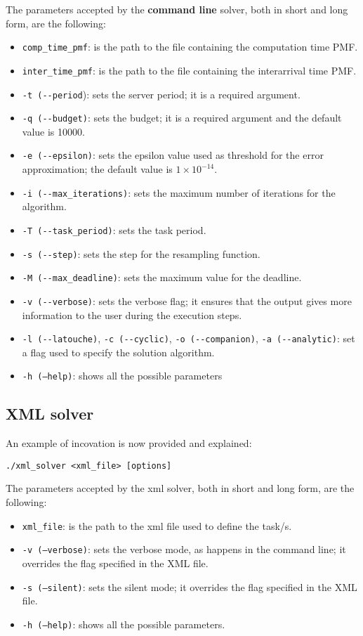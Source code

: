 The parameters accepted by the \textbf{command line} solver, both in short and long form, are the following:
\begin{itemize}
  \item \texttt{comp\_time\_pmf}: is the path to the file containing the computation time PMF.
  \item \texttt{inter\_time\_pmf}: is the path to the file containing the interarrival time PMF.
  \item \texttt{-t (-{}-period}): sets the server period; it is a required argument.
  \item \texttt{-q (-{}-budget)}: sets the budget; it is a required argument and the default value is 10000.
  \item \texttt{-e (-{}-epsilon)}: sets the epsilon value used as threshold for the error approximation; the default value is \( 1 \times 10^{-14} \).
  \item \texttt{-i (-{}-max\_iterations)}: sets the maximum number of iterations for the algorithm.
  \item \texttt{-T (-{}-task\_period)}: sets the task period.
  \item \texttt{-s (-{}-step)}: sets the step for the resampling function.
  \item \texttt{-M (-{}-max\_deadline)}: sets the maximum value for the deadline.
  \item \texttt{-v (-{}-verbose)}: sets the verbose flag; it ensures that the output gives more information to the user during the execution steps.
  \item \texttt{-l (-{}-latouche)}, \texttt{-c (-{}-cyclic)}, \texttt{-o (-{}-companion)}, \texttt{-a (-{}-analytic)}: set a flag used to specify the solution algorithm. 
  \item \texttt{-h (--help)}: shows all the possible parameters
\end{itemize}
 
\subsection{XML solver}
An example of incovation is now provided and explained:
\begin{lstlisting}[frame=bt, numbers=none]
  ./xml_solver <xml_file> [options]
\end{lstlisting}

The parameters accepted by the xml solver, both in short and long form, are the following:
\begin{itemize}
  \item \texttt{xml\_file}: is the path to the xml file used to define the task/s.
  \item \texttt{-v (--verbose)}: sets the verbose mode, as happens in the command line; it overrides the flag specified in the XML file.
  \item \texttt{-s (--silent)}: sets the silent mode; it overrides the flag specified in the XML file.
  \item \texttt{-h (--help)}: shows all the possible parameters.
\end{itemize}

